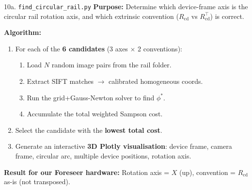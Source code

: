 \documentclass[aspectratio=169, 12pt]{beamer}
\newcommand{\Rcd}{R_{\mathrm{cd}}}
\begin{document}
\begin{frame}{10a. \texttt{find\_circular\_rail.py}}
\small
\textbf{Purpose:} Determine which device-frame axis is the circular rail
rotation axis, and which extrinsic convention ($\Rcd$ vs $\Rcd^\top$) is correct.

\medskip
\textbf{Algorithm:}
\begin{enumerate}\setlength{\itemsep}{2pt}
    \item For each of the \textbf{6 candidates} (3 axes $\times$ 2 conventions):
    \begin{enumerate}
        \item Load $N$ random image pairs from the rail folder.
        \item Extract SIFT matches $\to$ calibrated homogeneous coords.
        \item Run the grid+Gauss-Newton solver to find $\phi^*$.
        \item Accumulate the total weighted Sampson cost.
    \end{enumerate}
    \item Select the candidate with the \textbf{lowest total cost}.
    \item Generate an interactive \textbf{3D Plotly visualisation}:
          device frame, camera frame, circular arc, multiple device positions,
          rotation axis.
\end{enumerate}

\medskip
\textbf{Result for our Foreseer hardware:}
Rotation axis = $X$ (up), convention = $\Rcd$ as-is (not transposed).
\end{frame}
\end{document}
